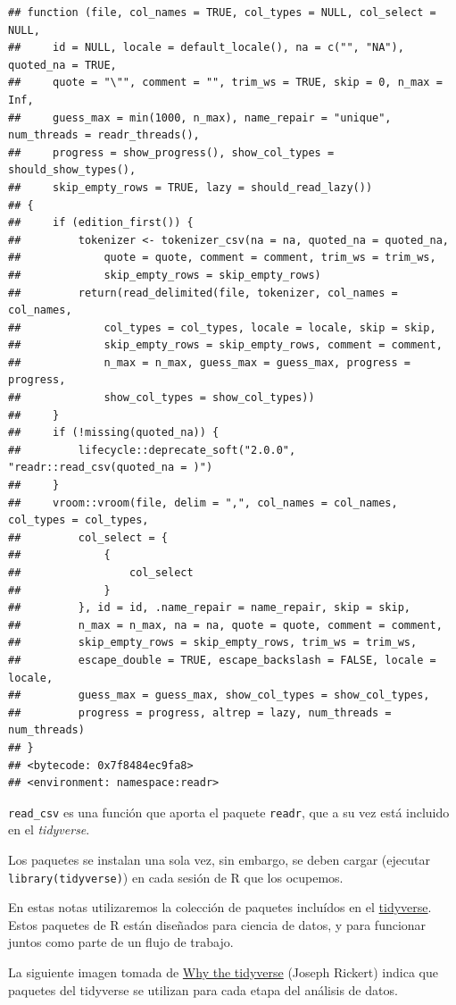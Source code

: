 \documentclass[
]{book}
\begin{document}
\begin{verbatim}
## function (file, col_names = TRUE, col_types = NULL, col_select = NULL, 
##     id = NULL, locale = default_locale(), na = c("", "NA"), quoted_na = TRUE, 
##     quote = "\"", comment = "", trim_ws = TRUE, skip = 0, n_max = Inf, 
##     guess_max = min(1000, n_max), name_repair = "unique", num_threads = readr_threads(), 
##     progress = show_progress(), show_col_types = should_show_types(), 
##     skip_empty_rows = TRUE, lazy = should_read_lazy()) 
## {
##     if (edition_first()) {
##         tokenizer <- tokenizer_csv(na = na, quoted_na = quoted_na, 
##             quote = quote, comment = comment, trim_ws = trim_ws, 
##             skip_empty_rows = skip_empty_rows)
##         return(read_delimited(file, tokenizer, col_names = col_names, 
##             col_types = col_types, locale = locale, skip = skip, 
##             skip_empty_rows = skip_empty_rows, comment = comment, 
##             n_max = n_max, guess_max = guess_max, progress = progress, 
##             show_col_types = show_col_types))
##     }
##     if (!missing(quoted_na)) {
##         lifecycle::deprecate_soft("2.0.0", "readr::read_csv(quoted_na = )")
##     }
##     vroom::vroom(file, delim = ",", col_names = col_names, col_types = col_types, 
##         col_select = {
##             {
##                 col_select
##             }
##         }, id = id, .name_repair = name_repair, skip = skip, 
##         n_max = n_max, na = na, quote = quote, comment = comment, 
##         skip_empty_rows = skip_empty_rows, trim_ws = trim_ws, 
##         escape_double = TRUE, escape_backslash = FALSE, locale = locale, 
##         guess_max = guess_max, show_col_types = show_col_types, 
##         progress = progress, altrep = lazy, num_threads = num_threads)
## }
## <bytecode: 0x7f8484ec9fa8>
## <environment: namespace:readr>
\end{verbatim}

\texttt{read\_csv} es una función que aporta el paquete \texttt{readr}, que a su vez está incluido en el
\emph{tidyverse}.

Los paquetes se instalan una sola vez, sin embargo, se deben cargar
(ejecutar \texttt{library(tidyverse)}) en cada sesión de R que los ocupemos.

En estas notas utilizaremos la colección de paquetes incluídos en el
\href{https://www.tidyverse.org/}{tidyverse}. Estos paquetes de R están
diseñados para ciencia de datos, y para funcionar juntos como parte de un flujo
de trabajo.

La siguiente imagen tomada de \href{https://rviews.rstudio.com/2017/06/08/what-is-the-tidyverse/}{Why the tidyverse} (Joseph
Rickert) indica que paquetes del tidyverse se utilizan para cada
etapa del análisis de datos.
\end{document}
